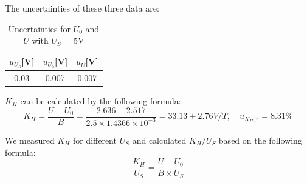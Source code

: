 \documentclass[12pt, a4paper]{article}
\begin{document}
The uncertainties of these three data are:
\begin{table}[!h]
	\begin{center}
		\begin{tabular}{|c|c|c|}
			\hline
			$u_{U_S}$[V] & $u_{U_0}$[V]& $u_U$[V] \\ \hline
			0.03 & 0.007 & 0.007 \\ \hline
		\end{tabular}
		\caption{Uncertainties for $U_0$ and $U$ with $U_S$ = 5V}
	\end{center}
\end{table}

$K_H$ can be calculated by the following formula:
$$
K_H = \frac{U-U_0}{B} = \frac{2.636-2.517}{2.5\times1.4366\times10^{-3}} = 33.13 \pm 2.76V/T,\quad u_{K_{H},r} = 8.31\%
$$
  
We measured $K_H$ for different $U_S$ and calculated $K_H/U_S$ based on the following formula:
$$
\frac{K_H}{U_S} = \frac{U-U_0}{B\times U_S}
$$
\end{document}
